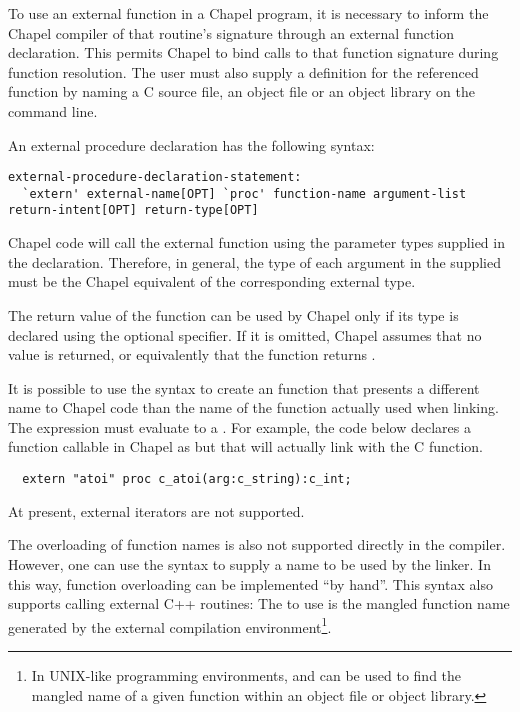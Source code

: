 To use an external function in a Chapel program, it is necessary to inform the
Chapel compiler of that routine's signature through an external function
declaration.  This permits Chapel to bind calls to that function signature
during function resolution.  The user must also supply a definition for the
referenced function by naming a C source file, an object file or an object
library on the  command line. 

An external procedure declaration has the following syntax:
\begin{syntax}
\begin{verbatim}
external-procedure-declaration-statement:
  `extern' external-name[OPT] `proc' function-name argument-list return-intent[OPT] return-type[OPT]
\end{verbatim}
\end{syntax}

Chapel code will call the external function using the parameter types supplied
in the  declaration. Therefore, in general, the type of each
argument in the supplied  must be the Chapel
equivalent of the corresponding external type.

The return value of the function can be used by Chapel only if its type is
declared using the optional  specifier.  If it is omitted,
Chapel assumes that no value is returned, or equivalently that the function
returns .

It is possible to use the  syntax to create an
 function that presents a different name to Chapel code than
the name of the function actually used when linking. The
 expression must evaluate to a 
. For example, the code below declares a function callable
in Chapel as  but that will actually link with the C
 function.

\begin{chapel}
\begin{verbatim}
  extern "atoi" proc c_atoi(arg:c_string):c_int;
\end{verbatim}
\end{chapel}

At present, external iterators are not supported.  

\begin{future}
The overloading of function names is
also not supported directly in the compiler.  However, one can use
the  syntax to supply a name to be used by the linker.  In
this way, function overloading can be implemented ``by hand''.  This syntax also
supports calling external C++ routines: The  to use is the
mangled function name generated by the external compilation
environment\footnote{In UNIX-like programming environments,  and 
can be used to find the mangled name of a given function within an object file
or object library.}.
\end{future}

